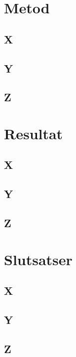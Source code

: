 \documentclass[a4paper, 10pt]{article}
\begin{document}
\label{ch:metod}
\section{Metod}
\subsection{X}
\subsection{Y}
\subsection{Z}





\label{ch:resultat}
\section{Resultat}
\subsection{X}
\subsection{Y}
\subsection{Z}





\label{ch:slutsatser}
\section{Slutsatser}
\subsection{X}
\subsection{Y}
\subsection{Z}



\end{document}
